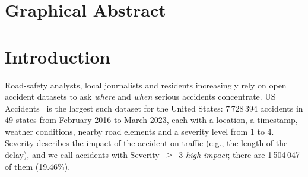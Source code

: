 \documentclass[conference]{IEEEtran}
\begin{document}
\section*{Graphical Abstract}
\begin{center}
\end{center}

\section{Introduction}

Road-safety analysts, local journalists and residents increasingly rely on open accident datasets to ask \emph{where} and \emph{when} serious accidents concentrate. US Accidents~\cite{moosavi2023dataset,moosavi2019countrywide,moosavi2019accident} is the largest such dataset for the United States: 7\,728\,394 accidents in 49 states from February 2016 to March 2023, each with a location, a timestamp, weather conditions, nearby road elements and a severity level from 1 to 4. Severity describes the impact of the accident on traffic (e.g., the length of the delay), and we call accidents with Severity~$\geq$~3 \emph{high-impact}; there are 1\,504\,047 of them (19.46\%).
\end{document}
